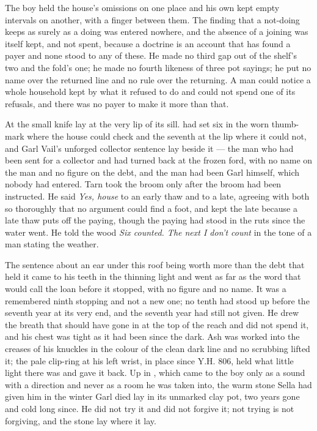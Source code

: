 The boy held the house's omissions on one place and his own kept empty intervals on another, with a finger between them. The finding that a not-doing keeps as surely as a doing was entered nowhere, and the absence of a joining was itself kept, and not spent, because a doctrine is an account that has found a payer and none stood to any of these. He made no third gap out of the shelf's two and the fold's one; he made no fourth likeness of three pot sayings; he put no name over the returned line and no rule over the returning. A man could notice a whole household kept by what it refused to do and could not spend one of its refusals, and there was no payer to make it more than that.

\scenebreak

At  the small knife lay at the very lip of its sill.  had set six in the worn thumb-mark where the house could check and the seventh at the lip where it could not, and Garl Vail's unforged collector sentence lay beside it --- the man who had been sent for a collector and had turned back at the frozen ford, with no name on the man and no figure on the debt, and the man had been Garl himself, which nobody had entered. Tarn took the broom only after the broom had been instructed. He said \emph{Yes, house} to an early thaw and to a late, agreeing with both so thoroughly that no argument could find a foot, and kept the late because a late thaw puts off the paying, though the paying had stood in the ruts since the water went. He told the wood \emph{Six counted. The next I don't count} in the tone of a man stating the weather.

The sentence about an ear under this roof being worth more than the debt that held it came to his teeth in the thinning light and went as far as the word that would call the loan before it stopped, with no figure and no name. It was a remembered ninth stopping and not a new one; no tenth had stood up before the seventh year at its very end, and the seventh year had still not given. He drew the breath that should have gone in at the top of the reach and did not spend it, and his chest was tight as it had been since the dark. Ash was worked into the creases of his knuckles in the colour of the clean dark line and no scrubbing lifted it; the pale clip-ring at his left wrist, in place since Y.H. 806, held what little light there was and gave it back. Up in , which came to the boy only as a sound with a direction and never as a room he was taken into, the warm stone Sella had given him in the winter Garl died lay in its unmarked clay pot, two years gone and cold long since. He did not try it and did not forgive it; not trying is not forgiving, and the stone lay where it lay.

